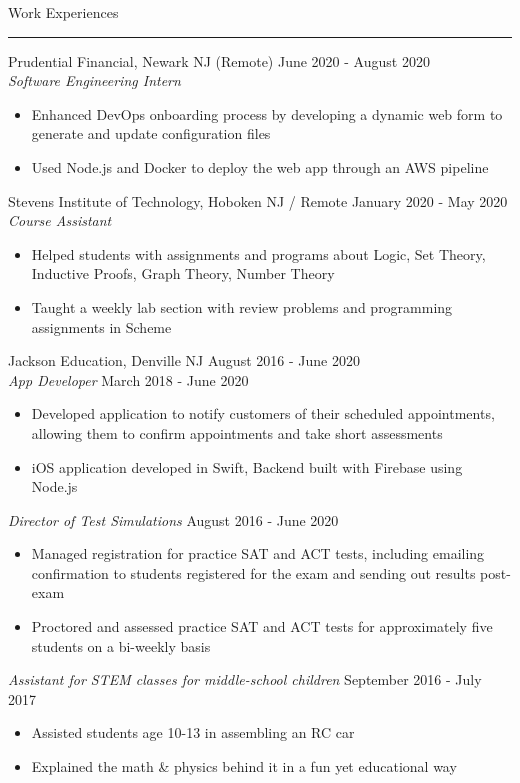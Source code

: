 \documentclass{article}
\begin{document}
\noindent
\huge Work Experiences\par
\vspace{0.1em}
\hrule
\Large
\vspace{1em}
\noindent
Prudential Financial, Newark NJ (Remote)
\hfill
June 2020 - August 2020\\
\textit{Software Engineering Intern}\\
\vspace{-1em}
\begin{itemize}
\item Enhanced DevOps onboarding process by developing a dynamic web form to generate and update configuration files
\item Used Node.js and Docker to deploy the web app through an AWS pipeline
\end{itemize}
Stevens Institute of Technology, Hoboken NJ / Remote
\hfill
January 2020 - May 2020\\
\textit{Course Assistant}\\
\vspace{-1em}
\begin{itemize}
\item Helped students with assignments and programs about Logic, Set Theory, Inductive Proofs, Graph Theory, Number Theory
\item Taught a weekly lab section with review problems and programming assignments in Scheme
\end{itemize}
Jackson Education, Denville NJ
\hfill
August 2016 - June 2020\\
\textit{App Developer}
\hfill
March 2018 - June 2020\\
\vspace{-1em}
\begin{itemize}
\item Developed application to notify customers of their scheduled appointments, allowing them to \mbox{confirm} appointments and take short assessments
\item iOS application developed in Swift, Backend built with Firebase using Node.js
\end{itemize}
\textit{Director of Test Simulations}
\hfill
August 2016 - June 2020\\
\vspace{-1em}
\begin{itemize}
\item Managed registration for practice SAT and ACT tests, including emailing confirmation to students registered for the exam and sending out results post-exam
\item Proctored and assessed practice SAT and ACT tests for approximately five students on a bi-weekly basis
\end{itemize}
\textit{Assistant for STEM classes for middle-school children}
\hfill
September 2016 - July 2017
\begin{itemize}
\item Assisted students age 10-13 in assembling an RC car
\item Explained the math \& physics behind it in a fun yet educational way
\end{itemize}
\end{document}
